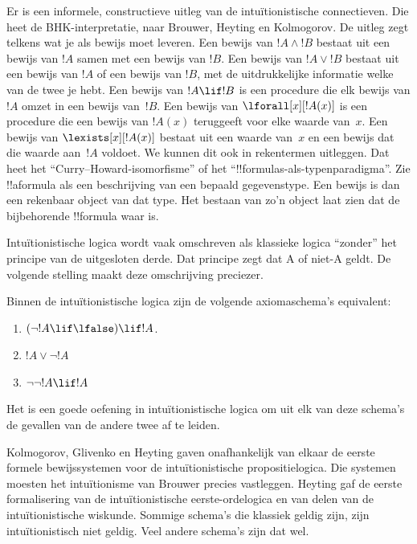 \documentclass[openany]{memoir}
\begin{document}
Er is een informele, constructieve uitleg van de intuïtionistische connectieven.
Die heet de BHK-interpretatie, naar Brouwer, Heyting en Kolmogorov. De uitleg
zegt telkens wat je als bewijs moet leveren. Een bewijs van $!A \land !B$ bestaat
uit een bewijs van $!A$ samen met een bewijs van $!B$. Een bewijs van $!A \lor !B$
bestaat uit een bewijs van $!A$ of een bewijs van $!B$, met de uitdrukkelijke
informatie welke van de twee je hebt. Een bewijs van $!A \lif !B$ is een
procedure die elk bewijs van $!A$ omzet in een bewijs van~$!B$. Een bewijs van
$\lforall[x][!A(x)]$ is een procedure die een bewijs van $!A(x)$ teruggeeft voor
elke waarde van~$x$. Een bewijs van $\lexists[x][!A(x)]$ bestaat uit een waarde
van~$x$ en een bewijs dat die waarde aan~$!A$ voldoet. We kunnen dit ook in
rekentermen uitleggen. Dat heet het ``Curry--Howard-isomorfisme'' of het
``!!{formula}s-als-typenparadigma''. Zie !!a{formula} als een beschrijving van een
bepaald gegevenstype. Een bewijs is dan een rekenbaar object van dat type. Het
bestaan van zo'n object laat zien dat de bijbehorende !!{formula} waar is.

Intuïtionistische logica wordt vaak omschreven als klassieke logica ``zonder''
het principe van de uitgesloten derde. Dat principe zegt dat A of niet-A geldt.
De volgende stelling maakt deze omschrijving preciezer.
\begin{thm}
Binnen de intuïtionistische logica zijn de volgende axiomaschema's equivalent:
\begin{enumerate}
\item $(\lnot !A \lif \lfalse) \lif !A$.
\item $!A \lor \lnot !A$
\item $\lnot \lnot !A \lif !A$
\end{enumerate}
\end{thm}
Het is een goede oefening in intuïtionistische logica om uit elk van deze
schema's de gevallen van de andere twee af te leiden.

Kolmogorov, Glivenko en Heyting gaven onafhankelijk van elkaar de eerste formele
bewijssystemen voor de intuïtionistische propositielogica. Die systemen moesten
het intuïtionisme van Brouwer precies vastleggen. Heyting gaf de eerste
formalisering van de intuïtionistische eerste-ordelogica en van delen van de
intuïtionistische wiskunde. Sommige schema's die klassiek geldig zijn, zijn
intuïtionistisch niet geldig. Veel andere schema's zijn dat wel.
\end{document}
